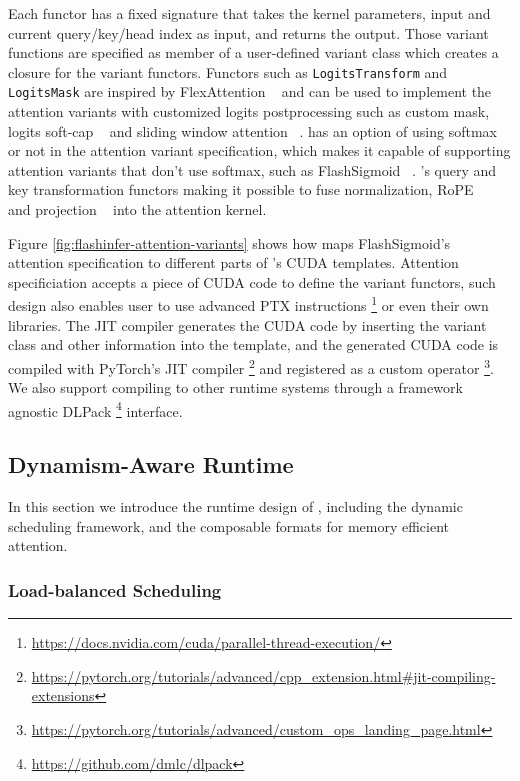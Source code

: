 Each functor has a fixed signature that takes the kernel parameters, input and current query/key/head index as input, and returns the output. Those variant functions are specified as member of a user-defined variant class which creates a closure for the variant functors. Functors such as \texttt{LogitsTransform} and \texttt{LogitsMask} are inspired by FlexAttention ~\cite{he2024flexattention} and can be used to implement the attention variants with customized logits postprocessing such as custom mask, logits soft-cap ~\cite{morgane2024gemma2,grok} and sliding window attention ~\cite{beltagy020longformer}. \sys has an option of using softmax or not in the attention variant specification, which makes it capable of supporting attention variants that don't use softmax, such as FlashSigmoid ~\cite{jason2024flashsigmoid}. \sys's query and key transformation functors making it possible to fuse normalization, RoPE ~\cite{su2024rope} and projection ~\cite{deepseekv2} into the attention kernel.

Figure \ref{fig:flashinfer-attention-variants} shows how \sys maps FlashSigmoid's ~\cite{jason2024flashsigmoid} attention specification to different parts of \sys's CUDA templates. Attention specificiation accepts a piece of CUDA code to define the variant functors, such design also enables user to use advanced PTX instructions \footnote{\url{https://docs.nvidia.com/cuda/parallel-thread-execution/}} or even their own libraries. The JIT compiler generates the CUDA code by inserting the variant class and other information into the template, and the generated CUDA code is compiled with PyTorch's JIT compiler \footnote{\url{https://pytorch.org/tutorials/advanced/cpp_extension.html\#jit-compiling-extensions}} and registered as a custom operator \footnote{\url{https://pytorch.org/tutorials/advanced/custom_ops_landing_page.html}}. We also support compiling to other runtime systems through a framework agnostic DLPack \footnote{\url{https://github.com/dmlc/dlpack}} interface.

\subsection{Dynamism-Aware Runtime}

In this section we introduce the runtime design of \sys, including the dynamic scheduling framework, and the composable formats for memory efficient attention.

\subsubsection{Load-balanced Scheduling}

